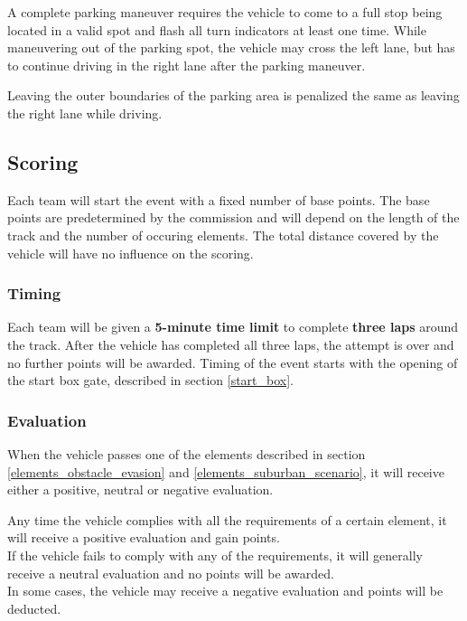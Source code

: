 A complete parking maneuver requires the vehicle to come to a full stop being
located in a valid spot  and flash all turn
indicators at least one time. While maneuvering out of the parking spot, the
vehicle may cross the left lane, but has to continue driving in the right lane
after the parking maneuver.

Leaving the outer boundaries of the parking area is penalized the same as
leaving the right lane while driving. 

\subsection{Scoring}{
	\label{obstacle_scoring}

	\renewcommand*\footnoterule{} %
	\newcommand{\topstrut}{\rule{0pt}{3.5ex}}

	Each team will start the event with a fixed number of base points. The base
	points are predetermined by the commission and will depend on the length of the
	track and the number of occuring elements. The total distance covered by the
	vehicle will have no influence on the scoring.

	\subsubsection{Timing}
	Each team will be given a \textbf{5-minute time limit} to complete
	\textbf{three laps} around the track. After the vehicle has completed all three
	laps, the attempt is over and no further points will be awarded. Timing of the
	event starts with the opening of the start box gate, described in section
	\ref{start_box}.

	\subsubsection{Evaluation}
	When the vehicle passes one of the elements described in section
	\ref{elements_obstacle_evasion} and \ref{elements_suburban_scenario}, it will
	receive either a positive, neutral or negative evaluation.

	Any time the vehicle complies with all the requirements of a certain element,
	it will receive a positive evaluation and gain points.\\ If the vehicle fails
	to comply with any of the requirements, it will generally receive a neutral
	evaluation and no points will be awarded.\\ In some cases, the vehicle may
	receive a negative evaluation and points will be deducted.

}

